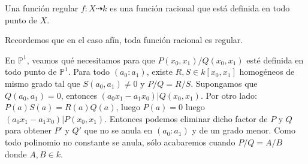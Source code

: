 \documentclass[ACGA.tex]{subfiles}
\begin{document}
\begin{defi}
Una función regular $f : X \dashrightarrow k$ es una función racional que está definida en todo punto de $X$.
\end{defi}

\begin{nota}
Recordemos que en el caso afín, toda función racional es regular.
\end{nota}

\begin{ej}
En $\mathbb{P}^1$, veamos qué necesitamos para que $P(x_0,x_1)/Q(x_0,x_1)$ esté definida en todo punto de $\mathbb{P}^1$. Para todo $(a_0:a_1)$, existe $R,S \in k[x_0,x_1]$ homogéneos de mismo grado tal que $S(a_0,a_1)\neq 0$ y $P/Q=R/S$. Supongamos que $Q(a_0,a_1)=0$, entonces $(a_0x_1-a_1x_0) | Q(x_0,x_1)$. Por otro lado: $P(a)S(a)=R(a)Q(a)$, luego $P(a)=0$ luego $(a_0x_1-a_1x_0) | P(x_0,x_1)$. Entonces podemos eliminar dicho factor de $P$ y $Q$ para obtener $P'$ y $Q'$ que no se anula en $(a_0:a_1)$ y de un grado menor. Como todo polinomio no constante se anula, sólo acabaremos cuando $P/Q=A/B$ donde $A,B \in k$. 
\end{ej}
\end{document}
